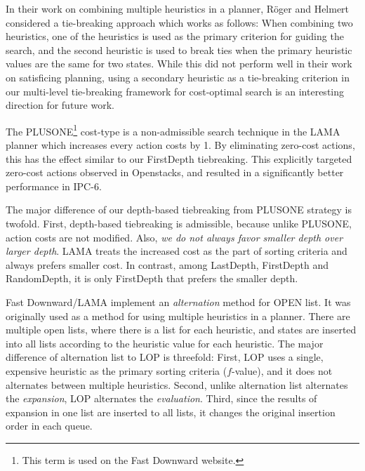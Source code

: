 In their work on combining multiple heuristics in a planner, R\"{o}ger
and Helmert  considered a tie-breaking approach which works as follows:
When combining two heuristics, one of the
heuristics is used as the primary criterion for guiding the search,
and the second heuristic is used to break ties when the primary
heuristic values are the same for two states.
While this did not perform well in their work on satisficing planning, 
using a secondary heuristic as a tie-breaking criterion in our multi-level tie-breaking framework 
for cost-optimal search is an interesting direction for future work.

The PLUSONE\footnote{This term is used on the Fast Downward website.}
cost-type is a non-admissible search technique in the LAMA planner
\cite{richter2010lama} which increases every action costs by 1.
By eliminating zero-cost actions, this has the effect similar to our
FirstDepth tiebreaking.
This explicitly targeted zero-cost actions observed in Openstacks,
and resulted in a significantly better performance in IPC-6.

The major difference of our depth-based tiebreaking from PLUSONE
strategy is twofold.  First, depth-based tiebreaking is admissible,
because unlike PLUSONE, action costs are not modified.  Also, \emph{we
do not always favor smaller depth over larger depth}. LAMA treats the
increased cost as the part of sorting criteria and always prefers
smaller cost. In contrast, among LastDepth,
FirstDepth and RandomDepth, it is only FirstDepth that prefers the smaller depth.


Fast Downward/LAMA implement an \emph{alternation}
method \cite{Helmert2006} for OPEN list. It was originally used as a method for using
multiple heuristics in a planner.  There are multiple open lists, where there is a list for each heuristic, and states are
inserted into all lists according to the heuristic value for each
heuristic.  The major difference of alternation list to LOP is threefold:
First, LOP uses a single, expensive heuristic as the primary sorting
criteria ($f$-value), and it does not alternates between multiple
heuristics. Second, unlike alternation list alternates the
\emph{expansion}, LOP alternates the \emph{evaluation}.
Third, since the results of expansion in one list are inserted to all lists,
it changes the original insertion order in each queue.

